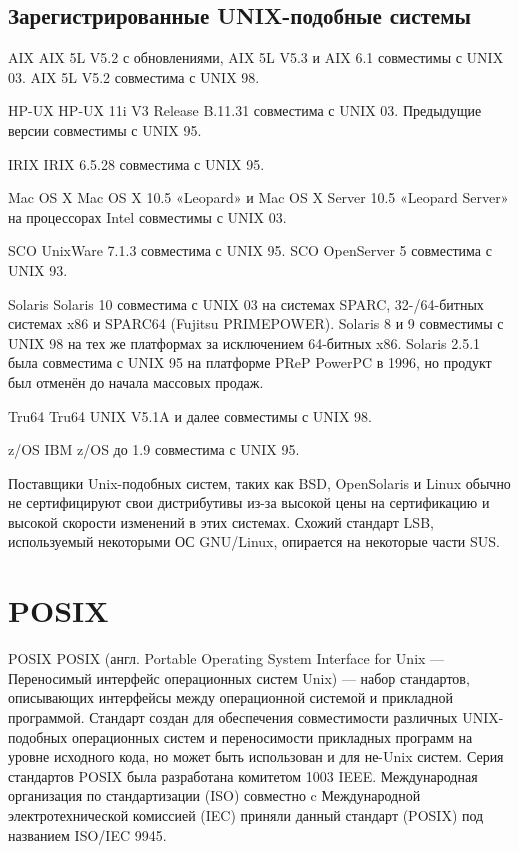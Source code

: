 \subsection{Зарегистрированные UNIX-подобные системы}

AIX
    AIX 5L V5.2 с обновлениями, AIX 5L V5.3 и AIX 6.1 совместимы с UNIX 03. AIX 5L V5.2 совместима с UNIX 98.

HP-UX
    HP-UX 11i V3 Release B.11.31 совместима с UNIX 03. Предыдущие версии совместимы с UNIX 95.

IRIX
    IRIX 6.5.28 совместима с UNIX 95.

Mac OS X
    Mac OS X 10.5 «Leopard» и Mac OS X Server 10.5 «Leopard Server» на процессорах Intel совместимы с UNIX 03.

SCO
    UnixWare 7.1.3 совместима с UNIX 95. SCO OpenServer 5 совместима с UNIX 93.

Solaris
    Solaris 10 совместима с UNIX 03 на системах SPARC, 32-/64-битных системах x86 и SPARC64 (Fujitsu PRIMEPOWER). Solaris 8 и 9 совместимы с UNIX 98 на тех же платформах за исключением 64-битных x86. Solaris 2.5.1 была совместима с UNIX 95 на платформе PReP PowerPC в 1996, но продукт был отменён до начала массовых продаж.

Tru64
    Tru64 UNIX V5.1A и далее совместимы с UNIX 98.

z/OS
    IBM z/OS до 1.9 совместима с UNIX 95.

Поставщики Unix-подобных систем, таких как BSD, OpenSolaris и Linux обычно не сертифицируют свои дистрибутивы из-за высокой цены на сертификацию и высокой скорости изменений в этих системах. Схожий стандарт LSB, используемый некоторыми ОС GNU/Linux, опирается на некоторые части SUS.
\section{POSIX}
POSIX
POSIX (англ. Portable Operating System Interface for Unix — Переносимый интерфейс операционных систем Unix) — набор стандартов, описывающих интерфейсы между операционной системой и прикладной программой. Стандарт создан для обеспечения совместимости различных UNIX-подобных операционных систем и переносимости прикладных программ на уровне исходного кода, но может быть использован и для не-Unix систем. Серия стандартов POSIX была разработана комитетом 1003 IEEE. Международная организация по стандартизации (ISO) совместно c Международной электротехнической комиссией (IEC) приняли данный стандарт (POSIX) под названием ISO/IEC 9945.

